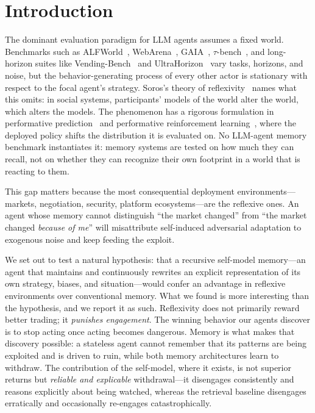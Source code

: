 \documentclass{article}
\begin{document}
\section{Introduction}

The dominant evaluation paradigm for LLM agents assumes a fixed world. Benchmarks such as ALFWorld~\citep{shridhar2021alfworld}, WebArena~\citep{zhou2024webarena}, GAIA~\citep{mialon2023gaia}, $\tau$-bench~\citep{yao2024taubench}, and long-horizon suites like Vending-Bench~\citep{backlund2025vendingbench} and UltraHorizon~\citep{luo2025ultrahorizon} vary tasks, horizons, and noise, but the behavior-generating process of every other actor is stationary with respect to the focal agent's strategy. Soros's theory of reflexivity~\citep{soros1987alchemy,soros2013fallibility} names what this omits: in social systems, participants' models of the world alter the world, which alters the models. The phenomenon has a rigorous formulation in performative prediction~\citep{perdomo2020performative} and performative reinforcement learning~\citep{mandal2023performativerl}, where the deployed policy shifts the distribution it is evaluated on. No LLM-agent memory benchmark instantiates it: memory systems are tested on how much they can recall, not on whether they can recognize their own footprint in a world that is reacting to them.

This gap matters because the most consequential deployment environments---markets, negotiation, security, platform ecosystems---are the reflexive ones. An agent whose memory cannot distinguish ``the market changed'' from ``the market changed \emph{because of me}'' will misattribute self-induced adversarial adaptation to exogenous noise and keep feeding the exploit.

We set out to test a natural hypothesis: that a recursive self-model memory---an agent that maintains and continuously rewrites an explicit representation of its own strategy, biases, and situation---would confer an advantage in reflexive environments over conventional memory. What we found is more interesting than the hypothesis, and we report it as such. Reflexivity does not primarily reward better trading; it \emph{punishes engagement}. The winning behavior our agents discover is to stop acting once acting becomes dangerous. Memory is what makes that discovery possible: a stateless agent cannot remember that its patterns are being exploited and is driven to ruin, while both memory architectures learn to withdraw. The contribution of the self-model, where it exists, is not superior returns but \emph{reliable and explicable} withdrawal---it disengages consistently and reasons explicitly about being watched, whereas the retrieval baseline disengages erratically and occasionally re-engages catastrophically.
\end{document}
